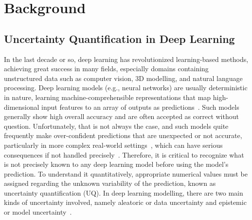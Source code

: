 \chapter{Background}\label{ch:background}



\section{Uncertainty Quantification in Deep Learning}\label{back_uqdl}
In the last decade or so, deep learning has revolutionized learning-based methods, achieving great success in many fields, especially domains containing unstructured data such as computer vision, 3D modelling, and natural language processing. Deep learning models (e.g., neural networks) are usually deterministic in nature, learning machine-comprehensible representations that map high-dimensional input features to an array of outputs as predictions~\cite{ReprLearn}. Such models generally show high overall accuracy and are often accepted as correct without question. Unfortunately, that is not always the case, and such models quite frequently make over-confident predictions that are unexpected or not accurate, particularly in more complex real-world settings~\cite{DLDifficult1, DLDifficult2}, which can have serious consequences if not handled precisely~\cite{DLDisaster1, DLDisaster2, DLDisaster3, DLDisaster4}. Therefore, it is critical to recognize what is not precisely known to any deep learning model before using the model's prediction. To understand it quantitatively, appropriate numerical values must be assigned regarding the unknown variability of the prediction, known as uncertainty quantification (UQ). In deep learning modelling, there are two main kinds of uncertainty involved, namely aleatoric or data uncertainty and epistemic or model uncertainty~\cite{UncertDeepL}.
\newline

